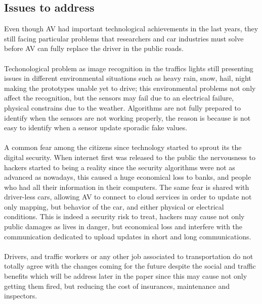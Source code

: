     \subsection{Issues to address}
    Even though AV had important technological achievements in the last years, they still facing particular problems that researchers and car industries must solve before AV can fully replace the driver in the public roads\cite{RAND}.\\
    \\Techonological problem as image recognition in the traffics lights still presenting issues in different environmental situations such as heavy rain, snow, hail, night making the prototypes unable yet to drive; this environmental problems not only affect the recognition, but the sensors may fail due to an electrical failure, physical constrains due to the weather. Algorithms are not fully prepared to identify when the sensors are not working properly, the reason is because is not easy to identify when a sensor update sporadic fake values.\\
    \\A common fear among the citizens since technology started to sprout its the digital security. When internet first was released to the public the nervousness to hackers started to being a reality since the security algorithms were not as advanced as nowadays, this caused a huge economical loss to banks, and people who had all their information in their computers. The same fear is shared with driver-less cars, allowing AV to connect to cloud services in order to update not only mapping, but behavior of the car, and either physical or electrical conditions. This is indeed a security risk to treat, hackers may cause not only public damages as lives in danger, but economical loss and interfere with the communication dedicated to upload updates in short and long communications.\\
    \\Drivers, and traffic workers or any other job associated to transportation do not totally agree with the changes coming for the future despite the social and traffic benefits which will be address later in the paper since this may cause not only getting them fired, but reducing the cost of insurances, maintenance and inspectors.\\
    
